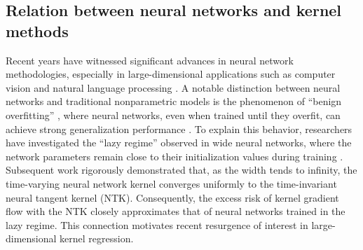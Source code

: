 \documentclass{article}
\theoremstyle{plain}
\theoremstyle{definition}
\theoremstyle{remark}
\begin{document}
\iffalse
\subsection{Relation between neural networks and kernel methods}
Recent years have witnessed significant advances in neural network methodologies, especially in large-dimensional applications such as computer vision \citep{he2016deep, krizhevsky2017imagenet} and natural language processing \citep{Devlin_BERT_2019}. 
A notable distinction between neural networks and traditional nonparametric models is the phenomenon of ``benign overfitting'' \citep{bartlett2020benign, frei2022benign, mallinar2022benign, sanyal2020benign}, where neural networks, even when trained until they overfit, can achieve strong generalization performance \citep{zhang2016understanding, zhang2021understanding, belkin2018understand, belkin2019does, belkin2021fit, nakkiran2021deep}.
To explain this behavior, researchers have investigated the ``lazy regime'' observed in wide neural networks, where the network parameters remain close to their initialization values during training \citep{arora2019fine, Du_gradient_2019_b, Du_gradient_2019_a, li2018learning}. 
Subsequent work \citep{Jacot_NTK_2018, Arora_on_2019, Hu_Regularization_2021, Namjoon_Non_2022, jianfa2022generalization, li2023statistical} rigorously demonstrated that, as the width tends to infinity, the time-varying neural network kernel converges uniformly to the time-invariant neural tangent kernel (NTK). Consequently, the excess risk of kernel gradient flow with the NTK closely approximates that of neural networks trained in the lazy regime.
This connection motivates recent resurgence of interest in large-dimensional kernel regression. 
\end{document}
